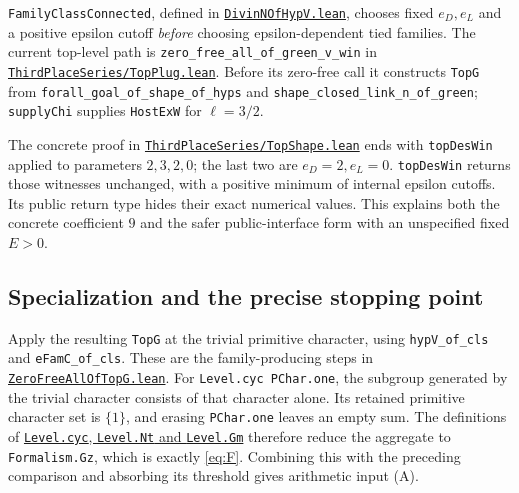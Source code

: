 \documentclass[11pt,a4paper]{article}
\theoremstyle{remark}\newtheorem{remark}[theorem]{Remark}
\begin{document}
\texttt{FamilyClassConnected}, defined in
\href{https://github.com/Deicyde/riemann-hypothesis/blob/40e56bab/src/Development/AutomorphicArithmetic/CharacterBoxes/DivinNOfHypV.lean}{\texttt{DivinNOfHypV.lean}},
chooses fixed \(e_D,e_L\) and a positive epsilon cutoff
\emph{before} choosing epsilon-dependent tied families. The
current top-level path is
\texttt{zero\_free\_all\_of\_green\_v\_win} in
\href{https://github.com/Deicyde/riemann-hypothesis/blob/40e56bab/src/Development/AutomorphicArithmetic/ThetaCorrespondence/ThetaPairLifts/ThirdPlaceSeries/TopPlug.lean}{\texttt{ThirdPlaceSeries/TopPlug.lean}}.
Before its zero-free call it constructs \texttt{TopG} from
\texttt{forall\_goal\_of\_shape\_of\_hyps} and
\texttt{shape\_closed\_link\_n\_of\_green}; \texttt{supplyChi}
supplies \texttt{HostExW} for \(\ell=3/2\).

The concrete proof in
\href{https://github.com/Deicyde/riemann-hypothesis/blob/40e56bab/src/Development/AutomorphicArithmetic/ThetaCorrespondence/ThetaPairLifts/ThirdPlaceSeries/TopShape.lean}{\texttt{ThirdPlaceSeries/TopShape.lean}}
ends with \texttt{topDesWin} applied to parameters
\(2,3,2,0\); the last two are \(e_D=2,e_L=0\).
\texttt{topDesWin} returns those witnesses unchanged, with a
positive minimum of internal epsilon cutoffs. Its public return
type hides their exact numerical values. This explains both the
concrete coefficient \(9\) and the safer public-interface
form with an unspecified fixed \(E>0\).

\subsection{Specialization and the precise stopping point}
Apply the resulting \texttt{TopG} at the trivial primitive
character, using \texttt{hypV\_of\_cls} and
\texttt{eFamC\_of\_cls}. These are the family-producing steps in
\href{https://github.com/Deicyde/riemann-hypothesis/blob/40e56bab/src/Development/AutomorphicArithmetic/CharacterBoxes/ZeroFreeAllOfTopG.lean}{\texttt{ZeroFreeAllOfTopG.lean}}.
For \texttt{Level.cyc PChar.one}, the subgroup generated by the
trivial character consists of that character alone. Its retained
primitive character set is \(\{1\}\), and erasing \texttt{PChar.one}
leaves an empty sum. The definitions of
\href{https://github.com/leanprover-community/riemann-hypothesis/blob/40e56bab/src/Formalism/SharpRestriction/RamificationFrobenius/TotientGaloisClasses/ExplicitFormulaErrorOfHostConditions.lean}{\texttt{Level.cyc}, \texttt{Level.Nt} and \texttt{Level.Gm}}
therefore reduce the aggregate to \texttt{Formalism.Gz},
which is exactly \eqref{eq:F}. Combining this with the preceding
comparison and absorbing its threshold gives arithmetic input (A).
\end{document}
